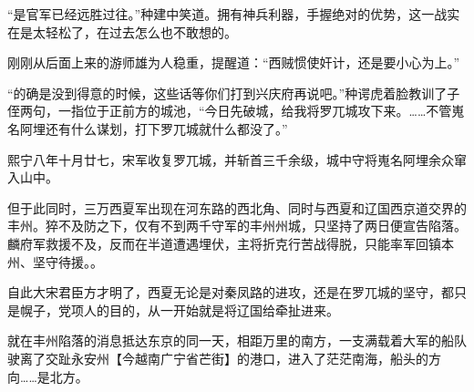 “是官军已经远胜过往。”种建中笑道。拥有神兵利器，手握绝对的优势，这一战实在是太轻松了，在过去怎么也不敢想的。

刚刚从后面上来的游师雄为人稳重，提醒道：“西贼惯使奸计，还是要小心为上。”

“的确是没到得意的时候，这些话等你们打到兴庆府再说吧。”种谔虎着脸教训了子侄两句，一指位于正前方的城池，“今日先破城，给我将罗兀城攻下来。……不管嵬名阿埋还有什么谋划，打下罗兀城就什么都没了。”

熙宁八年十月廿七，宋军收复罗兀城，并斩首三千余级，城中守将嵬名阿埋余众窜入山中。

但于此同时，三万西夏军出现在河东路的西北角、同时与西夏和辽国西京道交界的丰州。猝不及防之下，仅有不到两千守军的丰州州城，只坚持了两日便宣告陷落。麟府军救援不及，反而在半道遭遇埋伏，主将折克行苦战得脱，只能率军回镇本州、坚守待援。。

自此大宋君臣方才明了，西夏无论是对秦凤路的进攻，还是在罗兀城的坚守，都只是幌子，党项人的目的，从一开始就是将辽国给牵扯进来。

就在丰州陷落的消息抵达东京的同一天，相距万里的南方，一支满载着大军的船队驶离了交趾永安州【今越南广宁省芒街】的港口，进入了茫茫南海，船头的方向……是北方。

